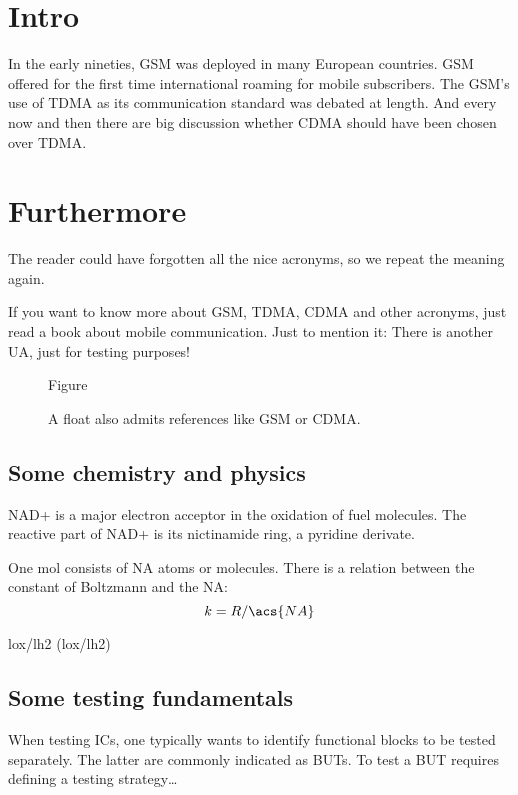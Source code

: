 \documentclass{article}
\begin{document}
\section{Intro}
In the early nineties, \acs{GSM} was deployed in many European
countries. \ac{GSM} offered for the first time international
roaming for mobile subscribers. The \acs{GSM}'s use of \ac{TDMA} as
its communication standard was debated at length. And every now
and then there are big discussion whether \ac{CDMA} should have
been chosen over \ac{TDMA}.

\section{Furthermore}
\acresetall
The reader could have forgotten all the nice acronyms, so we repeat the
meaning again.

If you want to know more about \acf{GSM}, \acf{TDMA}, \acf{CDMA}
and other acronyms, just read a book about mobile communication. Just
to mention it: There is another \ac{UA}, just for testing purposes!

\begin{figure}[h]
Figure
\caption{A float also admits references like \ac{GSM} or \acf{CDMA}.}
\end{figure}

\subsection{Some chemistry and physics}
\label{Chem}
\ac{NAD+} is a major electron acceptor in the oxidation
of fuel molecules. The reactive part of \ac{NAD+} is its nictinamide
ring, a pyridine derivate.

One mol consists of \acs{NA} atoms or molecules. There is a relation
between the constant of Boltzmann and the \acl{NA}:
\begin{equation}
  k = R/\acs{NA}
\end{equation}

\acl{lox}/\acl{lh2} (\acs{lox}/\acs{lh2})

\subsection{Some testing fundamentals}
When testing \acp{IC}, one typically wants to identify functional
blocks to be tested separately. The latter are commonly indicated as
\acp{BUT}. To test a \ac{BUT} requires defining a testing strategy\dots

\printacronyms
\end{document}
